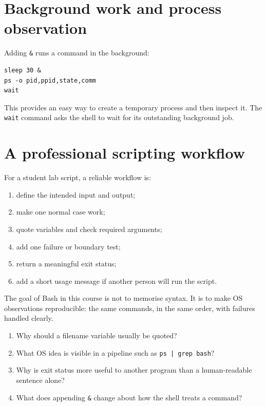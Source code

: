 \section{Background work and process observation}
Adding \texttt{\&} runs a command in the background:
\begin{lstlisting}[style=utpbash]
sleep 30 &
ps -o pid,ppid,state,comm
wait
\end{lstlisting}
This provides an easy way to create a temporary process and then inspect it. The \texttt{wait} command asks the shell to wait for its outstanding background job.

\section{A professional scripting workflow}
For a student lab script, a reliable workflow is:
\begin{enumerate}
  \item define the intended input and output;
  \item make one normal case work;
  \item quote variables and check required arguments;
  \item add one failure or boundary test;
  \item return a meaningful exit status;
  \item add a short usage message if another person will run the script.
\end{enumerate}

\begin{keyidea}
The goal of Bash in this course is not to memorise syntax. It is to make OS observations reproducible: the same commands, in the same order, with failures handled clearly.
\end{keyidea}

\begin{quickcheck}
\begin{enumerate}
  \item Why should a filename variable usually be quoted?
  \item What OS idea is visible in a pipeline such as \texttt{ps | grep bash}?
  \item Why is exit status more useful to another program than a human-readable sentence alone?
  \item What does appending \texttt{\&} change about how the shell treats a command?
\end{enumerate}
\end{quickcheck}

